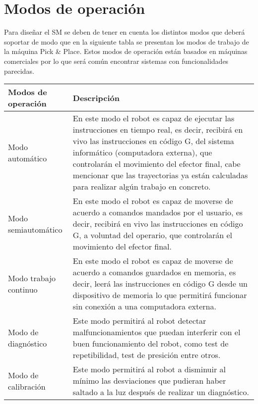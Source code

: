 \section{Modos de operaci\'on}

Para dise\~{n}ar el SM se deben de tener en cuenta los distintos modos que deber\'a soportar de modo que en la siguiente tabla se presentan los modos de trabajo de la m\'aquina Pick \& Place.
\newline
Estos modos de operaci\'on est\'an basados en m\'aquinas comerciales por lo que ser\'a com\'un encontrar sistemas con funcionalidades parecidas.
\newline

\begin{center}
\begin{tabular}{ | m{2cm} | m{5cm} | }
 \hline
Modos de operaci\'on  & Descripci\'on \\
 \hline\hline
 Modo autom\'atico & En este modo el robot es capaz de ejecutar las instrucciones en tiempo real, es decir, recibir\'a en vivo las instrucciones en c\'odigo G, del sistema inform\'atico (computadora externa),  que controlar\'an el movimiento del efector final, cabe mencionar que las trayectorias ya est\'an calculadas para realizar alg\'un trabajo en concreto.\\
\hline
 Modo semiautom\'atico & En este modo el robot es capaz de moverse de acuerdo a comandos mandados por el usuario, es decir, recibir\'a en vivo las instrucciones en c\'odigo G, a voluntad del operario,  que controlar\'an el movimiento del efector final.\\
\hline
 Modo trabajo continuo & En este modo el robot es capaz de moverse de acuerdo a comandos guardados en memoria, es decir, leer\'a las instrucciones en c\'odigo G desde un dispositivo de memoria lo que permitir\'a funcionar sin conexi\'on a una computadora externa.\\
\hline
 Modo de diagn\'ostico & Este modo permitir\'a al robot detectar malfuncionamientos que puedan interferir con el buen funcionamiento del robot, como test de repetibilidad, test de presici\'on entre otros.\\
\hline
 Modo de calibraci\'on & Este modo permitir\'a al robot a disminuir al m\'inimo las desviaciones que pudieran haber saltado a la luz despu\'es de realizar un diagn\'ostico.\\
\hline
\end{tabular}
\end{center}
